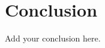 \documentclass{article}
\begin{document}
\section{Conclusion}
\label{sec:conclusion}
Add your conclusion here. 

\newpage



\end{document}
